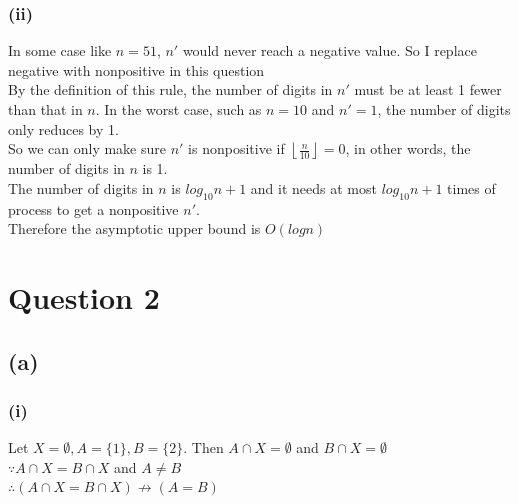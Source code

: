 \documentclass{article} %
\begin{document}
\subsubsection*{(ii)}
In some case like $n = 51$, $n'$ would never reach a negative value. So I replace negative with nonpositive in this question\\
By the definition of this rule, the number of digits in $n'$ must be at least 1 fewer than that in $n$. In the worst case, such as $n = 10$ and $n' = 1$, the number of digits only reduces by 1.\\
So we can only make sure $n'$ is nonpositive if $\left\lfloor \frac{n}{10} \right\rfloor = 0$, in other words, the number of digits in $n$ is 1.\\
The number of digits in $n$ is $log_{10}n + 1$ and it needs at most $log_{10}n + 1$ times of process to get a nonpositive $n'$.\\
Therefore the asymptotic upper bound is $O(logn)$\\
\section*{Question 2}
\subsection*{(a)}
\subsubsection*{(i)}
Let $X=\emptyset, A=\{1\}, B=\{2\}$. Then $A \cap X = \emptyset $ and $B \cap X = \emptyset $\\
$\because A \cap X = B \cap X$ and $A \neq B$\\
$\therefore (A \cap X = B \cap X) \not\to (A = B) $
\end{document}
